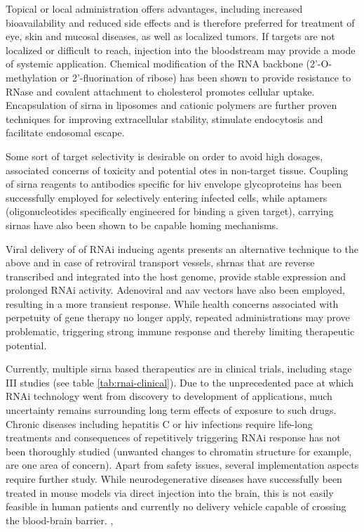 Topical or local administration offers advantages, including increased bioavailability and reduced side effects and is therefore preferred for treatment of eye, skin and mucosal diseases, as well as localized tumors. If targets are not localized or difficult to reach, injection into the bloodstream may provide a mode of systemic application. Chemical modification of the RNA backbone (2'-O-methylation or 2'-fluorination of ribose) has been shown to provide resistance to RNase and covalent attachment to cholesterol promotes cellular uptake. Encapsulation of \gls{sirna} in liposomes and cationic polymers are further proven techniques for improving extracellular stability, stimulate endocytosis and facilitate endosomal escape.

Some sort of target selectivity is desirable on order to avoid high dosages, associated concerns of toxicity and potential \glspl{ote} in non-target tissue. Coupling of \gls{sirna} reagents to antibodies specific for \gls{hiv} envelope glycoproteins has been successfully employed for selectively entering infected cells, while aptamers (oligonucleotides specifically engineered for binding a given target), carrying \glspl{sirna} have also been shown to be capable homing mechanisms.

Viral delivery of of RNAi inducing agents presents an alternative technique to the above and in case of retroviral transport vessels, \glspl{shrna} that are reverse transcribed and integrated into the host genome, provide stable expression and prolonged RNAi activity. Adenoviral and \gls{aav} vectors have also been employed, resulting in a more transient response. While health concerns associated with perpetuity of gene therapy no longer apply, repeated administrations may prove problematic, triggering strong immune response and thereby limiting therapeutic potential.

Currently, multiple \gls{sirna} based therapeutics are in clinical trials, including stage III studies (see table \ref{tab:rnai-clinical}). Due to the unprecedented pace at which RNAi technology went from discovery to development of applications, much uncertainty remains surrounding long term effects of exposure to such drugs. Chronic diseases including hepatitis C or \gls{hiv} infections require life-long treatments and consequences of repetitively triggering RNAi response has not been thoroughly studied (unwanted changes to chromatin structure for example, are one area of concern). Apart from safety issues, several implementation aspects require further study. While neurodegenerative diseases have successfully been treated in mouse models via direct injection into the brain, this is not easily feasible in human patients and currently no delivery vehicle capable of crossing the blood-brain barrier. \citep{Kim2007,Whitehead2009},
